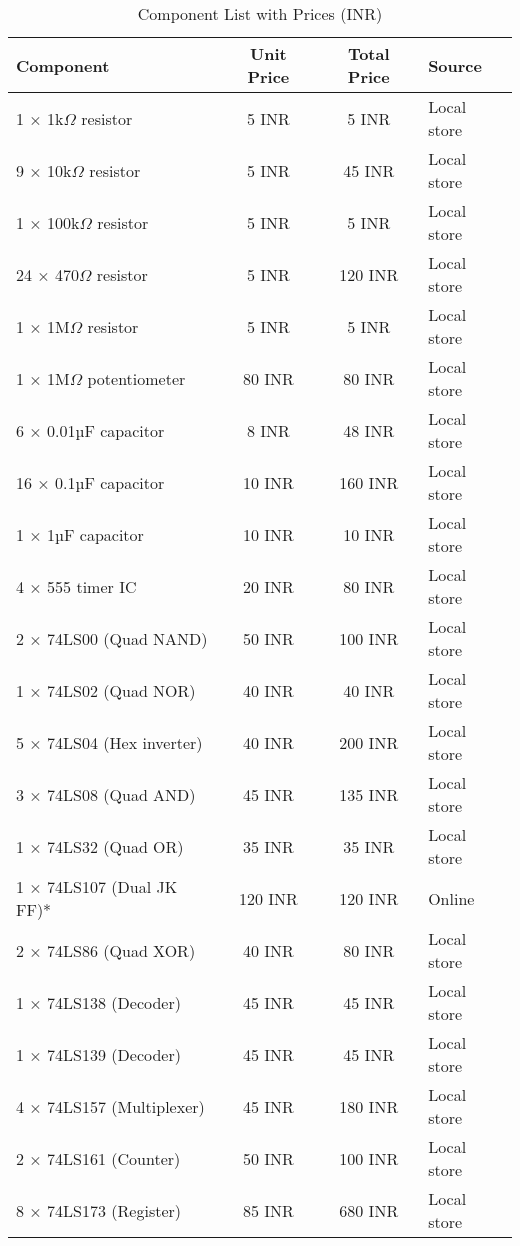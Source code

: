 \documentclass[a4paper,12pt]{article}
\begin{document}
\begin{table}[htbp]
\centering
\caption{Component List with Prices (INR)}
\renewcommand{\arraystretch}{1.1}
\small
\begin{tabular}{|p{4cm}|c|c|p{2.5cm}|}
\hline
\textbf{Component} & \textbf{Unit Price} & \textbf{Total Price} & \textbf{Source} \\
\hline
1 × 1k$\Omega$ resistor & 5 INR & 5 INR & Local store\\
\hline
9 × 10k$\Omega$ resistor & 5 INR & 45 INR & Local store\\
\hline
1 × 100k$\Omega$ resistor & 5 INR & 5 INR & Local store\\
\hline
24 × 470$\Omega$ resistor & 5 INR & 120 INR & Local store\\
\hline
1 × 1M$\Omega$ resistor & 5 INR & 5 INR & Local store\\
\hline
1 × 1M$\Omega$ potentiometer & 80 INR & 80 INR & Local store\\
\hline
6 × 0.01µF capacitor & 8 INR & 48 INR & Local store\\
\hline
16 × 0.1µF capacitor & 10 INR & 160 INR & Local store\\
\hline
1 × 1µF capacitor & 10 INR & 10 INR & Local store\\
\hline
4 × 555 timer IC & 20 INR & 80 INR & Local store\\
\hline
2 × 74LS00 (Quad NAND) & 50 INR & 100 INR & Local store\\
\hline
1 × 74LS02 (Quad NOR) & 40 INR & 40 INR & Local store\\
\hline
5 × 74LS04 (Hex inverter) & 40 INR & 200 INR & Local store\\
\hline
3 × 74LS08 (Quad AND) & 45 INR & 135 INR & Local store\\
\hline
1 × 74LS32 (Quad OR) & 35 INR & 35 INR & Local store\\
\hline
1 × 74LS107 (Dual JK FF)* & 120 INR & 120 INR & Online\\
\hline
2 × 74LS86 (Quad XOR) & 40 INR & 80 INR & Local store\\
\hline
1 × 74LS138 (Decoder) & 45 INR & 45 INR & Local store\\
\hline
1 × 74LS139 (Decoder) & 45 INR & 45 INR & Local store\\
\hline
4 × 74LS157 (Multiplexer) & 45 INR & 180 INR & Local store\\
\hline
2 × 74LS161 (Counter) & 50 INR & 100 INR & Local store\\
\hline
8 × 74LS173 (Register) & 85 INR & 680 INR & Local store\\

\end{tabular}
\end{table}
\end{document}
